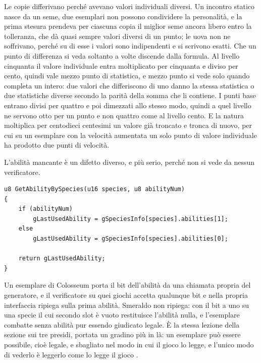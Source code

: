 Le copie differivano perché avevano valori individuali diversi. Un incontro statico nasce da un seme, due esemplari non possono condividere la personalità, e la prima stesura prendeva per ciascuna copia il miglior seme ancora libero entro la tolleranza, che dà quasi sempre valori diversi di un punto; le uova non ne soffrivano, perché su di esse i valori sono indipendenti e si scrivono esatti. Che un punto di differenza si veda soltanto a volte discende dalla formula. Al livello cinquanta il valore individuale entra moltiplicato per cinquanta e diviso per cento, quindi vale mezzo punto di statistica, e mezzo punto si vede solo quando completa un intero: due valori che differiscono di uno danno la stessa statistica o due statistiche diverse secondo la parità della somma che li contiene. I punti base entrano divisi per quattro e poi dimezzati allo stesso modo, quindi a quel livello ne servono otto per un punto e non quattro come al livello cento. E la natura moltiplica per centodieci centesimi un valore già troncato e tronca di nuovo, per cui su un esemplare con la velocità aumentata un solo punto di valore individuale ha prodotto due punti di velocità.

L'abilità mancante è un difetto diverso, e più serio, perché non si vede da nessun verificatore.

\begin{lstlisting}[style=c,caption={Da \texttt{src/pokemon.c}, riga 4546: nessun ripiego sul primo slot quando il secondo è vuoto.}]
u8 GetAbilityBySpecies(u16 species, u8 abilityNum)
{
    if (abilityNum)
        gLastUsedAbility = gSpeciesInfo[species].abilities[1];
    else
        gLastUsedAbility = gSpeciesInfo[species].abilities[0];

    return gLastUsedAbility;
}
\end{lstlisting}

Un esemplare di Colosseum porta il bit dell'abilità da una chiamata propria del generatore, e il verificatore su quei giochi accetta qualunque bit e nella propria interfaccia ripiega sulla prima abilità. Smeraldo non ripiega: con il bit a uno su una specie il cui secondo slot è vuoto restituisce l'abilità nulla, e l'esemplare combatte senza abilità pur essendo giudicato legale. È la stessa lezione della sezione sui tre presidi, portata un gradino più in là: un esemplare può essere possibile, cioè legale, e sbagliato nel modo in cui il gioco lo legge, e l'unico modo di vederlo è leggerlo come lo legge il gioco \cite{pokeemerald}.

